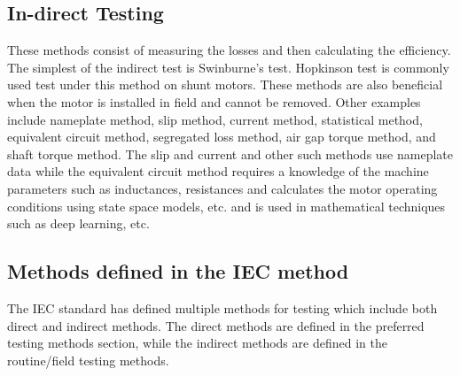 \subsection{In-direct Testing}
These methods consist of measuring the losses and then calculating the efficiency. The simplest of the indirect test is Swinburne’s test. Hopkinson test is commonly used test under this method on shunt motors. These methods are also beneficial when the motor is installed in field and cannot be removed. Other examples include nameplate method, slip method, current method, statistical method, equivalent circuit method, segregated loss method, air gap torque method, and shaft torque method. The slip and current and other such methods use nameplate data while the equivalent circuit method requires a knowledge of the machine parameters such as inductances, resistances and calculates the motor operating conditions using state space models, etc. and is used in mathematical techniques such as deep learning, etc.

\subsection{Methods defined in the IEC method}
The IEC standard has defined multiple methods for testing which include both direct and indirect methods. The direct methods are defined in the preferred testing methods section, while the indirect methods are defined in the routine/field testing methods.

